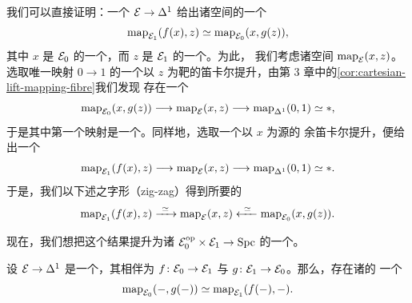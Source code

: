 \begin{remark}\label{rem:adjunction-map-equivalence}
我们可以直接证明：一个\trAdjunction{} $\mathcal{E} \to \Delta^1$ 给出诸空间的一个%
\trEquivalence{}%
\[
\mathrm{map}_{\mathcal{E}_1}(f(x), z) \simeq \mathrm{map}_{\mathcal{E}_0}(x, g(z)),
\]
其中 $x$ 是 $\mathcal{E}_0$ 的一个\trObject{}，而 $z$ 是 $\mathcal{E}_1$ 的一个\trObject{}。为此，
我们考虑诸空间 $\mathrm{map}_{\mathcal{E}}(x, z)$。选取唯一映射 $0 \to 1$ 的一个以 $z$
为靶的笛卡尔提升，由第 3 章中的\cref{cor:cartesian-lift-mapping-fibre}我们发现
存在一个\trFibreSequence{}%
\[
\mathrm{map}_{\mathcal{E}_0}(x, g(z)) \longrightarrow \mathrm{map}_{\mathcal{E}}(x, z)
  \longrightarrow \mathrm{map}_{\Delta^1}(0, 1) \simeq *,
\]
于是其中第一个映射是一个\trHomotopyEquivalence{}。同样地，选取一个以 $x$ 为源的
余笛卡尔提升，便给出一个\trFibreSequence{}%
\[
\mathrm{map}_{\mathcal{E}_1}(f(x), z) \longrightarrow \mathrm{map}_{\mathcal{E}}(x, z)
  \longrightarrow \mathrm{map}_{\Delta^1}(0, 1) \simeq *.
\]
于是，我们以下述之字形（zig-zag）得到所要的\trEquivalence{}%
\[
\mathrm{map}_{\E_1}(f(x), z) \xrightarrow{\ \simeq\ } \mathrm{map}_{\E}(x, z)
  \xleftarrow{\ \simeq\ } \mathrm{map}_{\E_0}(x, g(z)).
\]
\end{remark}

现在，我们想把这个结果提升为诸\trFunctor{}%
$\mathcal{E}_0^{\mathrm{op}} \times \mathcal{E}_1 \to \mathrm{Spc}$ 的一个\trNaturalEquivalence{}。

\begin{proposition}\label{prop:adjunction-map-natural-equivalence}
设 $\mathcal{E} \to \Delta^1$ 是一个\trAdjunction{}，其相伴\trFunctor{}为
$f\colon \mathcal{E}_0 \to \mathcal{E}_1$ 与 $g\colon \mathcal{E}_1 \to \mathcal{E}_0$。那么，存在诸\trFunctor{}的
一个\trNaturalEquivalence{}%
\[
\mathrm{map}_{\mathcal{E}_0}(-, g(-)) \simeq \mathrm{map}_{\mathcal{E}_1}(f(-), -).
\]
\end{proposition}

